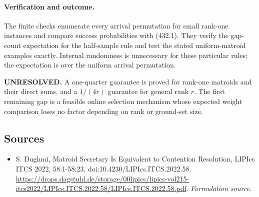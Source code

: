 \documentclass[11pt]{article}
\begin{document}
\paragraph{Verification and outcome.}
The finite checks enumerate every arrival permutation for small rank-one instances and compare success probabilities with (432.1). They verify the gap-count expectation for the half-sample rule and test the stated uniform-matroid examples exactly. Internal randomness is unnecessary for these particular rules; the expectation is over the uniform arrival permutation.

\textbf{UNRESOLVED.} A one-quarter guarantee is proved for rank-one matroids and their direct sums, and a $1/(4r)$ guarantee for general rank $r$. The first remaining gap is a feasible online selection mechanism whose expected weight comparison loses no factor depending on rank or ground-set size.

\subsection{Sources}
\begin{itemize}
\item[S1]S. Dughmi, Matroid Secretary Is Equivalent to Contention Resolution, LIPIcs ITCS 2022, 58:1-58:23, doi:10.4230/LIPIcs.ITCS.2022.58.
\url{https://drops.dagstuhl.de/storage/00lipics/lipics-vol215-itcs2022/LIPIcs.ITCS.2022.58/LIPIcs.ITCS.2022.58.pdf}.
\textit{Formulation source.}
\end{itemize}
\end{document}
